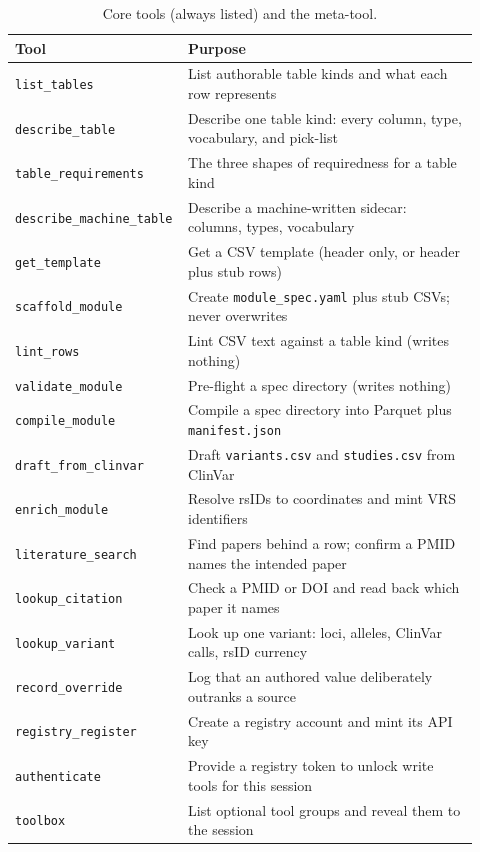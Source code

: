\documentclass[11pt,a4paper]{article}
\begin{document}
\begin{table}[ht]
\centering
\scriptsize
\caption{Core tools (always listed) and the meta-tool.}
\label{tab:tools-core}
\begin{tabular}{@{}p{0.30\linewidth}p{0.62\linewidth}@{}}
\toprule
Tool & Purpose \\
\midrule
\texttt{list\_tables}           & List authorable table kinds and what each row represents \\
\texttt{describe\_table}        & Describe one table kind: every column, type, vocabulary, and pick-list \\
\texttt{table\_requirements}    & The three shapes of requiredness for a table kind \\
\texttt{describe\_machine\_table} & Describe a machine-written sidecar: columns, types, vocabulary \\
\texttt{get\_template}          & Get a CSV template (header only, or header plus stub rows) \\
\texttt{scaffold\_module}       & Create \texttt{module\_spec.yaml} plus stub CSVs; never overwrites \\
\texttt{lint\_rows}             & Lint CSV text against a table kind (writes nothing) \\
\texttt{validate\_module}       & Pre-flight a spec directory (writes nothing) \\
\texttt{compile\_module}        & Compile a spec directory into Parquet plus \texttt{manifest.json} \\
\texttt{draft\_from\_clinvar}   & Draft \texttt{variants.csv} and \texttt{studies.csv} from ClinVar \\
\texttt{enrich\_module}         & Resolve rsIDs to coordinates and mint VRS identifiers \\
\texttt{literature\_search}     & Find papers behind a row; confirm a PMID names the intended paper \\
\texttt{lookup\_citation}       & Check a PMID or DOI and read back which paper it names \\
\texttt{lookup\_variant}        & Look up one variant: loci, alleles, ClinVar calls, rsID currency \\
\texttt{record\_override}       & Log that an authored value deliberately outranks a source \\
\texttt{registry\_register}     & Create a registry account and mint its API key \\
\texttt{authenticate}           & Provide a registry token to unlock write tools for this session \\
\texttt{toolbox}                & List optional tool groups and reveal them to the session \\
\bottomrule
\end{tabular}
\end{table}
\end{document}
